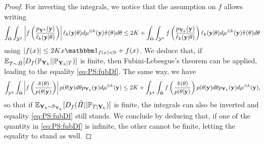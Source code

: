 \begin{proof}
        For inverting the integrals, we notice that the assumption on $f$ allows writing 
        \begin{equation}\label{eq:PS:prooffub1Dfbound}
            \int_{\tilde\Theta}\int_{\cY^k} \left|f\left( \frac{p_{\mbf Y^k}(\mbf y)}{\ell_k(\mbf y|\theta)}\right)\right|\ell_k(\mbf y|\theta) d\mu^{\otimes k}(\mbf y) \tilde\pi(\theta)d\theta \leq 2K + %
            \int_{\tilde\Theta}\int_{\cY^k} f\left(\frac{p_{\mbf Y_k}(\mbf y)}{\ell_k(\mbf y|\theta)}\right)\ell_k(\mbf y|\theta)d\mu^{\otimes k}(\mbf y)\tilde\pi(\theta)d\theta %
        \end{equation}
        using $|f(x)|\leq 2Kx\indic_{f(x)<0}+f(x)$.
        We deduce that, if $\mathbb{E}_{T\sim\tilde\varPi}[D_f(\mathbb{P}_{\mathbf{Y}_k}||\mathbb{P}_{\mathbf{Y}_k|T})]$ is finite, then Fubini-Lebesgue's theorem can be applied, leading to the equality \eqref{eq:PS:fubDf}.
        The same way, we have
        \begin{equation}
            \int_{\mathcal{Y}^k} \int_{\tilde\Theta} \left|f\left( \frac{\tilde\pi(\theta)}{p(\theta|\mathbf{y})}\right)\right|p(\theta|\mathbf{y})d\theta p_{\mathbf{Y}_k}(\mathbf{y}) d\mu^{\otimes k}(\mathbf{y}) 
            \leq 2K + \int_{\mathcal{Y}^k}\int_{\tilde\Theta}f\left( \frac{\tilde\pi(\theta)}{p(\theta|\mathbf{y})}\right) p(\theta|\mathbf{y})d\theta p_{\mathbf{Y}_k}(\mathbf{y}) d\mu^{\otimes k}(\mathbf{y}),
        \end{equation} 
        so that if $\mathbb{E}_{\mathbf{Y}_k\sim\mathbb{P}_{\mathbf{Y}_k}}[D_f(\tilde\varPi||\mathbb{P}_{T|\mathbf{Y}_k})]$ is finite, the integrals can also be inverted and equality \eqref{eq:PS:fubDf} still stands.
        We conclude by deducing that, if one of the quantity in \cref{eq:PS:fubDf} is infinite, the other cannot be finite, letting the equality to stand as well.
\end{proof}

